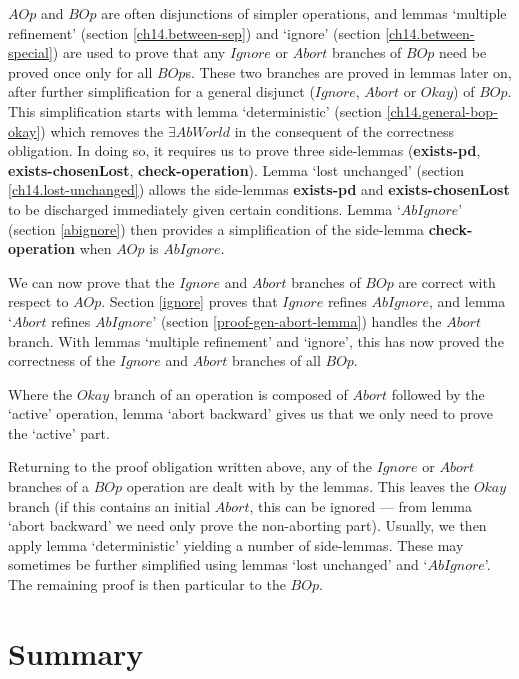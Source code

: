 $AOp$ and $BOp$ are often disjunctions of simpler operations, and
lemmas `multiple refinement' (section \ref{ch14.between-sep}) and
`ignore' (section \ref{ch14.between-special}) are used to prove that
any $Ignore$ or $Abort$ branches of $BOp$ need be proved once only
for all $BOp$s. These two branches are proved in lemmas later on,
after further simplification for a general disjunct ($Ignore$,
$Abort$ or $Okay$) of $BOp$.  This simplification starts with lemma
`deterministic' (section \ref{ch14.general-bop-okay}) which removes
the $\exists AbWorld$ in the consequent of the correctness
obligation. In doing so, it requires us to prove three side-lemmas
({\bf exists-pd}, {\bf exists-chosenLost}, {\bf check-operation}).
Lemma `lost unchanged' (section \ref{ch14.lost-unchanged}) allows the
side-lemmas {\bf exists-pd} and {\bf
  exists-chosenLost} to be discharged immediately given certain
conditions.  Lemma `$AbIgnore$' (section \ref{abignore}) then
provides a simplification of the side-lemma {\bf check-operation}
when $AOp$ is $AbIgnore$.

We can now prove that the $Ignore$ and $Abort$ branches of $BOp$ are
correct with respect to $AOp$.  Section \ref{ignore} proves that
$Ignore$ refines $AbIgnore$, and lemma `$Abort$ refines $AbIgnore$'
(section \ref{proof-gen-abort-lemma}) handles the $Abort$ branch.
With lemmas `multiple refinement' and `ignore', this has now proved
the correctness of the $Ignore$ and $Abort$ branches of all $BOp$.

Where the $Okay$ branch of an operation is composed of $Abort$
followed by the `active' operation, lemma `abort backward' gives us
that we only need to prove the `active' part.

Returning to the proof obligation written above, any of the $Ignore$
or $Abort$ branches of a $BOp$ operation are dealt with by the
lemmas. This leaves the $Okay$ branch (if this contains an initial
$Abort$, this can be ignored --- from lemma `abort backward' we need
only prove the non-aborting part).  Usually, we then apply lemma
`deterministic' yielding a number of side-lemmas.  These may
sometimes be further simplified using lemmas `lost unchanged' and
`$AbIgnore$'.  The remaining proof is then particular to the $BOp$.


\newpage
\section{Summary}\label{ch14.summary}

\ldefsummary %
\lthmsummary %
\lthmaddeddefsummary %
\lthmaddedthmsummary %
\lzevessummary %
